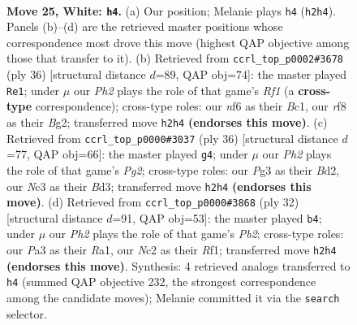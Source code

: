 \documentclass[11pt]{article}
\begin{document}
\begin{figure}[p]
\label{fig:thought-m46}
\end{figure}

\clearpage

\begin{figure}[p]\centering
\begin{subfigure}{0.46\textwidth}\centering
\resizebox{\linewidth}{!}{%
\newchessgame
\chessboard[
  setfen={r1bq1rk1/2pn1pb1/1p1p1n2/3P3p/p1P5/P1NB2P1/1PN1Q2P/R1B2RK1 w - - 5 25},
  showmover=false,
  pgfstyle=straightmove, color=movearrow, markmove={h2-h4}
]}
\caption{}
\end{subfigure}\hfill
\begin{subfigure}{0.46\textwidth}\centering
\resizebox{\linewidth}{!}{%
\newchessgame
\chessboard[
  setfen={1rb1r1k1/3n1pb1/1q1p1n1p/p1pP2p1/4P3/R1N2NPP/1PQ2PB1/2B2RK1 w - - 0 19},
  showmover=false,
  pgfstyle=straightmove, color=movearrow, markmove={f1-e1}
]}
\caption{}
\end{subfigure}
\\[4pt]
\begin{subfigure}{0.46\textwidth}\centering
\resizebox{\linewidth}{!}{%
\newchessgame
\chessboard[
  setfen={r2q1rk1/1bbn1ppp/p4n2/1p2pP2/4P3/PNNB3P/1P1BQ1P1/R4RK1 w - - 0 19},
  showmover=false,
  pgfstyle=straightmove, color=movearrow, markmove={g2-g4}
]}
\caption{}
\end{subfigure}\hfill
\begin{subfigure}{0.46\textwidth}\centering
\resizebox{\linewidth}{!}{%
\newchessgame
\chessboard[
  setfen={1rb2rk1/2q1bpp1/2p1nn2/1p2p2p/4P3/2NNBP2/1PP1BQPP/R4RK1 w - - 4 17},
  showmover=false,
  pgfstyle=straightmove, color=movearrow, markmove={b2-b4}
]}
\caption{}
\end{subfigure}
\caption{\textbf{Move 25, White: \texttt{h4}.} (a) Our position; Melanie plays \texttt{h4} (\texttt{h2h4}). Panels (b)--(d) are the retrieved master positions whose correspondence most drove this move (highest QAP objective among those that transfer to it). (b) Retrieved from \texttt{ccrl\_top\_p0002\#3678} (ply 36) [structural distance $d$=89, QAP obj=74]: the master played \texttt{Re1}; under $\mu$ our \emph{Ph2} plays the role of that game's \emph{Rf1} (a \textbf{cross-type} correspondence); cross-type roles: our \emph{n}f6 as their \emph{B}c1, our \emph{r}f8 as their \emph{B}g2; transferred move \texttt{h2h4} \textbf{(endorses this move)}. (c) Retrieved from \texttt{ccrl\_top\_p0000\#3037} (ply 36) [structural distance $d$=77, QAP obj=66]: the master played \texttt{g4}; under $\mu$ our \emph{Ph2} plays the role of that game's \emph{Pg2}; cross-type roles: our \emph{P}g3 as their \emph{B}d2, our \emph{N}c3 as their \emph{B}d3; transferred move \texttt{h2h4} \textbf{(endorses this move)}. (d) Retrieved from \texttt{ccrl\_top\_p0000\#3868} (ply 32) [structural distance $d$=91, QAP obj=53]: the master played \texttt{b4}; under $\mu$ our \emph{Ph2} plays the role of that game's \emph{Pb2}; cross-type roles: our \emph{P}a3 as their \emph{R}a1, our \emph{N}c2 as their \emph{R}f1; transferred move \texttt{h2h4} \textbf{(endorses this move)}. Synthesis: 4 retrieved analogs transferred to \texttt{h4} (summed QAP objective 232, the strongest correspondence among the candidate moves); Melanie committed it via the \texttt{search} selector.}

\end{figure}
\end{document}
